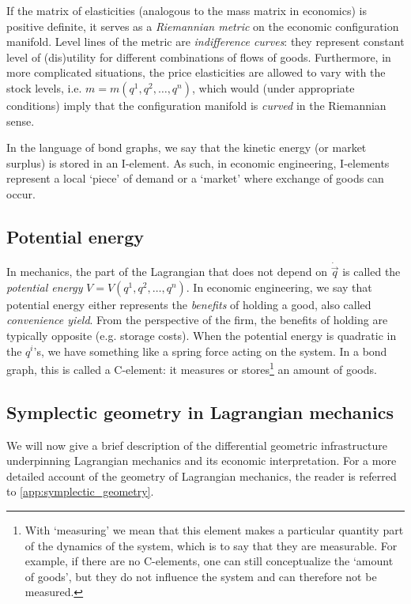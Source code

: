 If the matrix of elasticities (analogous to the mass matrix in economics) is positive definite, it serves as a \emph{Riemannian metric} on the economic configuration manifold. Level lines of the metric are \emph{indifference curves}: they represent constant level of (dis)utility for different combinations of flows of goods. Furthermore, in more complicated situations, the price elasticities are allowed to vary with the stock levels, i.e. \( m = m(q^1, q^2, \ldots, q^n)\), which would (under appropriate conditions) imply that the  configuration manifold is \emph{curved} in the Riemannian sense.

In the language of bond graphs, we say that the kinetic energy (or market surplus) is stored in an I-element. As such, in economic engineering, I-elements represent a local `piece' of demand or a `market' where exchange of goods can occur.

\subsection{Potential energy} In mechanics, the part of the Lagrangian that does not depend on \(\dot{\vec{q}}\) is called the \emph{potential energy} \(V = V(q^1, q^2, \ldots, q^n)\). In economic engineering, we say that potential energy either represents the \emph{benefits} of holding a good, also called \emph{convenience yield}. From the perspective of the firm, the benefits of holding are typically opposite (e.g. storage costs). When the potential energy is quadratic in the \(q^i\)'s, we have something like a spring force acting on the system. In a bond graph, this is called a C-element: it measures or stores\footnote{With `measuring' we mean that this element makes a particular quantity part of the dynamics of the system, which is to say that they are measurable. For example, if there are no C-elements, one can still conceptualize the `amount of goods', but they do not influence the system and can therefore not be measured.} an amount of goods.

\subsection{Symplectic geometry in Lagrangian mechanics} 
We will now give a brief description of the differential geometric infrastructure underpinning Lagrangian mechanics and its economic interpretation. For a more detailed account of the geometry of Lagrangian mechanics, the reader is referred to \cref{app:symplectic_geometry}.

